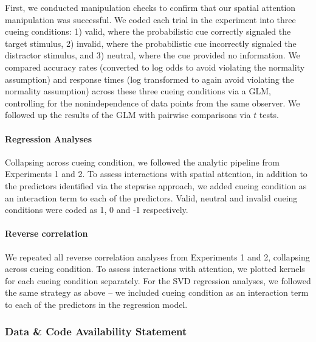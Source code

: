 \documentclass[a4paper, nobind]{templates/ociamthesis}
\begin{document}
First, we conducted manipulation checks to confirm that our spatial attention manipulation was successful. We coded each trial in the experiment into three cueing conditions: 1) valid, where the probabilistic cue correctly signaled the target stimulus, 2) invalid, where the probabilistic cue incorrectly signaled the distractor stimulus, and 3) neutral, where the cue provided no information. We compared accuracy rates (converted to log odds to avoid violating the normality assumption) and response times (log transformed to again avoid violating the normality assumption) across these three cueing conditions via a GLM, controlling for the nonindependence of data points from the same observer. We followed up the results of the GLM with pairwise comparisons via \(t\) tests.

\hypertarget{regression-analyses}{%
\paragraph{Regression Analyses}\label{regression-analyses}}

Collapsing across cueing condition, we followed the analytic pipeline from Experiments 1 and 2. To assess interactions with spatial attention, in addition to the predictors identified via the stepwise approach, we added cueing condition as an interaction term to each of the predictors. Valid, neutral and invalid cueing conditions were coded as 1, 0 and -1 respectively.

\hypertarget{reverse-correlation-3}{%
\paragraph{Reverse correlation}\label{reverse-correlation-3}}

We repeated all reverse correlation analyses from Experiments 1 and 2, collapsing across cueing condition. To assess interactions with attention, we plotted kernels for each cueing condition separately. For the SVD regression analyses, we followed the same strategy as above -- we included cueing condition as an interaction term to each of the predictors in the regression model.

\hypertarget{data-code-availability-statement-3}{%
\subsubsection{Data \& Code Availability Statement}\label{data-code-availability-statement-3}}
\end{document}
